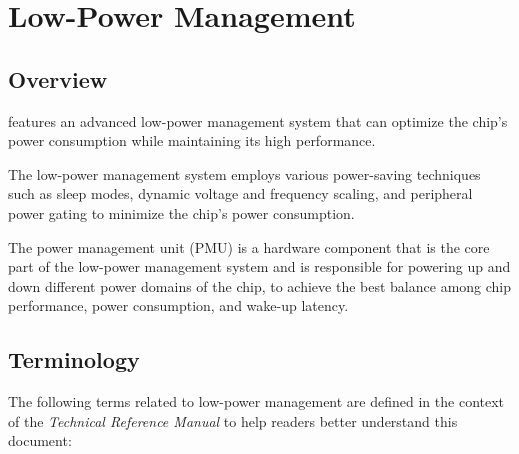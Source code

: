\documentclass[main\_\_EN.tex]{subfiles}
\begin{document}

\ifglobal
\else
    {\let\clearpage\relax \listoftodos}
    {\let\clearpage\relax \listofdonetodos}
    \tableofcontents
\fi





\hypertarget{lowpowm}{}
\chapter{Low-Power Management}\label{mod:lowpowm}

\section{Overview}

\chipname{} features an advanced low-power management system that can optimize the chip's power consumption while maintaining its high performance.

The low-power management system employs various power-saving techniques such as sleep modes, dynamic voltage and frequency scaling, and peripheral power gating to minimize the chip's power consumption.

The power management unit (PMU) is a hardware component that is the core part of the low-power management system and is responsible for powering up and down different power domains of the chip, to achieve the best balance among chip performance, power consumption, and wake-up latency.

\section{Terminology}

The following terms related to low-power management are defined in the context of the \textit{\chipname{} Technical Reference Manual}
to help readers better understand this document:
\end{document}
